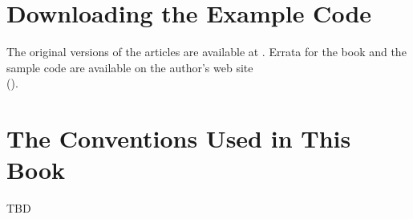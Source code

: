\section*{Downloading the Example Code}

The original versions of the articles are available at
. Errata for the book and the sample
code are available on the author's web site\\
().

\section*{The Conventions Used in This Book}

TBD
